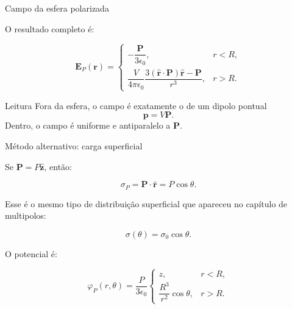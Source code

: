 \documentclass[aspectratio=169]{beamer}
\begin{document}
\begin{frame}{Campo da esfera polarizada}

\small

O resultado completo é:

\begin{eqbox}
\begin{equation}
\mathbf E_P(\mathbf r)
=
\begin{cases}
-\dfrac{\mathbf P}{3\epsilon_0},
& r<R,\\[0.35cm]
\dfrac{V}{4\pi\epsilon_0}
\dfrac{3(\hat{\mathbf r}\cdot\mathbf P)\hat{\mathbf r}-\mathbf P}{r^3},
& r>R.
\end{cases}
\tag{6.17}
\label{eq:campo-esfera-polarizada}
\end{equation}
\end{eqbox}

\begin{alertblock}{Leitura}
Fora da esfera, o campo é exatamente o de um dipolo pontual
\[
\mathbf p=V\mathbf P.
\]
Dentro, o campo é uniforme e antiparalelo a \(\mathbf P\).
\end{alertblock}

\end{frame}

\begin{frame}{Método alternativo: carga superficial}

\small

Se \(\mathbf P=P\hat{\mathbf z}\), então:

\[
\sigma_P=\mathbf P\cdot\hat{\mathbf r}=P\cos\theta.
\tag{6.18}
\]

Esse é o mesmo tipo de distribuição superficial que apareceu no capítulo de
multipolos:

\[
\sigma(\theta)=\sigma_0\cos\theta.
\]

O potencial é:

\begin{eqbox}
\begin{equation}
\varphi_P(r,\theta)
=
\frac{P}{3\epsilon_0}
\begin{cases}
z, & r<R,\\[0.2cm]
\dfrac{R^3}{r^2}\cos\theta, & r>R.
\end{cases}
\tag{6.19}
\label{eq:potencial-esfera-polarizada}
\end{equation}
\end{eqbox}

\end{frame}
\end{document}
